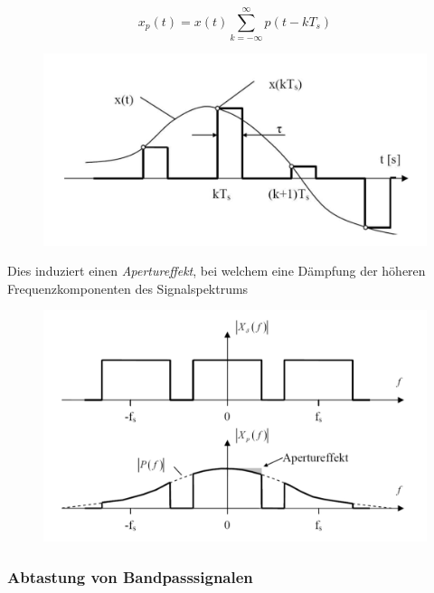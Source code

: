 \documentclass[
  10pt,
  a4paper,
  german]{article}
\numberwithin{equation}{section}
\begin{document}
\[
x_p(t)=x(t)\sum_{k=-\infty}^{\infty}{p(t-kT_s)}
\]

\begin{figure}[H]

{\centering \includegraphics{images/02_FlatTop.png}

}

\end{figure}

Dies induziert einen \emph{Apertureffekt}, bei welchem eine Dämpfung der
höheren Frequenzkomponenten des Signalspektrums

\begin{figure}[H]

{\centering \includegraphics{images/02_ApertureEffekt.png}

}

\end{figure}

\hypertarget{abtastung-von-bandpasssignalen}{%
\subsubsection{Abtastung von
Bandpasssignalen}\label{abtastung-von-bandpasssignalen}}
\end{document}
